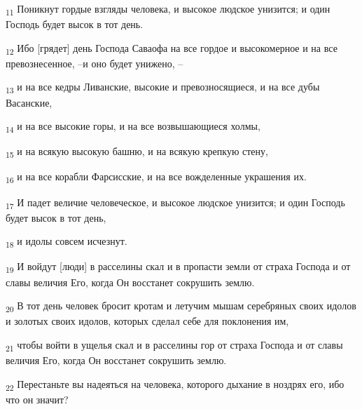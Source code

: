 \begin{tcolorbox}
\textsubscript{11} Поникнут гордые взгляды человека, и высокое людское унизится; и один Господь будет высок в тот день.
\end{tcolorbox}
\begin{tcolorbox}
\textsubscript{12} Ибо [грядет] день Господа Саваофа на все гордое и высокомерное и на все превознесенное, --и оно будет унижено, --
\end{tcolorbox}
\begin{tcolorbox}
\textsubscript{13} и на все кедры Ливанские, высокие и превозносящиеся, и на все дубы Васанские,
\end{tcolorbox}
\begin{tcolorbox}
\textsubscript{14} и на все высокие горы, и на все возвышающиеся холмы,
\end{tcolorbox}
\begin{tcolorbox}
\textsubscript{15} и на всякую высокую башню, и на всякую крепкую стену,
\end{tcolorbox}
\begin{tcolorbox}
\textsubscript{16} и на все корабли Фарсисские, и на все вожделенные украшения их.
\end{tcolorbox}
\begin{tcolorbox}
\textsubscript{17} И падет величие человеческое, и высокое людское унизится; и один Господь будет высок в тот день,
\end{tcolorbox}
\begin{tcolorbox}
\textsubscript{18} и идолы совсем исчезнут.
\end{tcolorbox}
\begin{tcolorbox}
\textsubscript{19} И войдут [люди] в расселины скал и в пропасти земли от страха Господа и от славы величия Его, когда Он восстанет сокрушить землю.
\end{tcolorbox}
\begin{tcolorbox}
\textsubscript{20} В тот день человек бросит кротам и летучим мышам серебряных своих идолов и золотых своих идолов, которых сделал себе для поклонения им,
\end{tcolorbox}
\begin{tcolorbox}
\textsubscript{21} чтобы войти в ущелья скал и в расселины гор от страха Господа и от славы величия Его, когда Он восстанет сокрушить землю.
\end{tcolorbox}
\begin{tcolorbox}
\textsubscript{22} Перестаньте вы надеяться на человека, которого дыхание в ноздрях его, ибо что он значит?
\end{tcolorbox}

